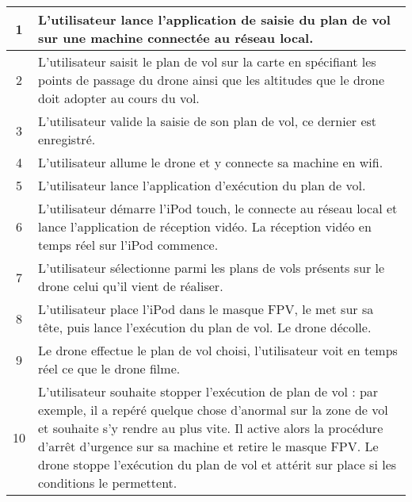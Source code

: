 \documentclass{article}
\begin{document}
	    \begin{center}
	    \renewcommand{\arraystretch}{2}
        \begin{tabularx}{15cm}{|c|X|}
            \hline
            1 & L'utilisateur lance l'application de saisie du plan de vol sur une machine connectée au réseau local.\\
            \hline
            2 & L'utilisateur saisit le plan de vol sur la carte en spécifiant les points de passage du drone ainsi que les altitudes que le drone doit adopter au cours du vol. \\
            \hline
            3 & L'utilisateur valide la saisie de son plan de vol, ce dernier est enregistré. \\
            \hline
            4 & L'utilisateur allume le drone et y connecte sa machine en wifi. \\
            \hline
            5 & L'utilisateur lance l'application d'exécution du plan de vol. \\
            \hline
            6 &  L'utilisateur démarre l'iPod touch, le connecte au réseau local et lance l'application de réception vidéo. La réception vidéo en temps réel sur l'iPod commence.\\
            \hline
            7 & L'utilisateur sélectionne parmi les plans de vols présents sur le drone celui qu'il vient de réaliser. \\
            \hline
            8 & L'utilisateur place l'iPod dans le masque FPV, le met sur sa tête, puis lance l'exécution du plan de vol. Le drone décolle. \\
            \hline
            9 & Le drone effectue le plan de vol choisi, l'utilisateur voit en temps réel ce que le drone filme. \\
            \hline
            10 & L'utilisateur souhaite stopper l'exécution de plan de vol : par exemple, il a repéré quelque chose d'anormal sur la zone de vol et souhaite s'y rendre au plus vite. Il active alors la procédure d'arrêt d'urgence sur sa machine et retire le masque FPV. Le drone stoppe l'exécution du plan de vol et attérit sur place si les conditions le permettent. \\
            \hline
        \end{tabularx}
        \end{center}
        
\end{document}
